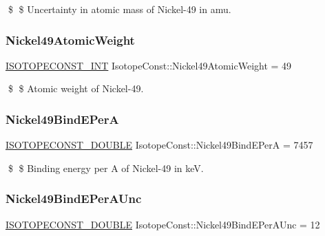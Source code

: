\$ \$ Uncertainty in atomic mass of Nickel-\/49 in amu. \mbox{\label{group___isotope_const-_nickel-_ni49_ga507f9030e146c004b6ba881bddd7c471}} 
\subsubsection{\texorpdfstring{Nickel49\+Atomic\+Weight}{Nickel49AtomicWeight}}
{\footnotesize\ttfamily \mbox{\hyperlink{group___isotope_const-_macros_ga5f18360b3e99483a35c32d789e62621c}{I\+S\+O\+T\+O\+P\+E\+C\+O\+N\+S\+T\+\_\+\+I\+NT}} Isotope\+Const\+::\+Nickel49\+Atomic\+Weight = 49}

\$ \$ Atomic weight of Nickel-\/49. \mbox{\label{group___isotope_const-_nickel-_ni49_gad529200e6d98ed53ddbf889470212574}} 
\subsubsection{\texorpdfstring{Nickel49\+Bind\+E\+PerA}{Nickel49BindEPerA}}
{\footnotesize\ttfamily \mbox{\hyperlink{group___isotope_const-_macros_ga8f45a7272ce02c0b4c65c44636ed719a}{I\+S\+O\+T\+O\+P\+E\+C\+O\+N\+S\+T\+\_\+\+D\+O\+U\+B\+LE}} Isotope\+Const\+::\+Nickel49\+Bind\+E\+PerA = 7457}

\$ \$ Binding energy per A of Nickel-\/49 in keV. \mbox{\label{group___isotope_const-_nickel-_ni49_ga53a9f382a3486bf644f4715e68c6ef0f}} 
\subsubsection{\texorpdfstring{Nickel49\+Bind\+E\+Per\+A\+Unc}{Nickel49BindEPerAUnc}}
{\footnotesize\ttfamily \mbox{\hyperlink{group___isotope_const-_macros_ga8f45a7272ce02c0b4c65c44636ed719a}{I\+S\+O\+T\+O\+P\+E\+C\+O\+N\+S\+T\+\_\+\+D\+O\+U\+B\+LE}} Isotope\+Const\+::\+Nickel49\+Bind\+E\+Per\+A\+Unc = 12}

